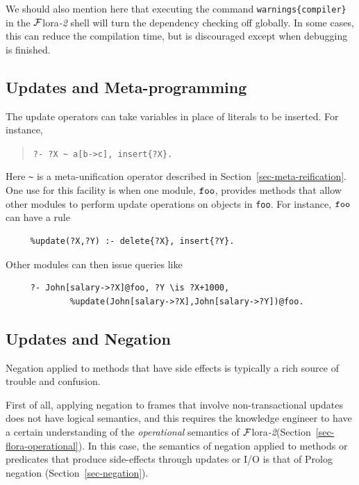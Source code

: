 \documentclass[11pt]{article}
\newcommand{\FLORA}{{\mbox{\sc ${\cal F}${lora}\rm\emph{-2}}}\xspace}
\newcommand{\FLSYSTEM}{\FLORA}
\begin{document}
We should also mention here that executing the command
\texttt{warnings\{compiler\}} in the \FLSYSTEM shell will turn the dependency
checking off globally. In some cases, this can 
reduce the compilation time, but is discouraged except when debugging is
finished.



\subsection{Updates and Meta-programming}

The update operators can take variables in place of literals to be
inserted.  For instance,
\begin{quote}
 {\tt ?-  ?X \verb|~| a[b->c], insert\{?X\}.}
\end{quote}
  Here \verb|~| is a meta-unification operator described in
  Section~\ref{sec-meta-reification}.
One use for this facility is when one module, $\tt foo$, provides methods that
allow other modules to perform update operations on objects in {\tt foo}.
For instance, $\tt foo$ can have a rule
\begin{verbatim}
     %update(?X,?Y) :- delete{?X}, insert{?Y}.
\end{verbatim}
Other modules can then issue queries like
\begin{verbatim}
     ?- John[salary->?X]@foo, ?Y \is ?X+1000,
             %update(John[salary->?X],John[salary->?Y])@foo.  
\end{verbatim}

\subsection{Updates and Negation}

Negation applied to methods that have side effects is typically a rich source
of trouble and confusion.

First of all, applying negation to frames that involve
non-transactional updates does not have logical semantics, and this
requires the
knowledge engineer to have a certain understanding of the \emph{operational} semantics of
\FLSYSTEM (Section~\ref{sec-flora-operational}).
In this case, the semantics of negation applied to methods or predicates that produce
side-effects through updates  or I/O is that of Prolog negation
(Section~\ref{sec-negation}).
\end{document}
